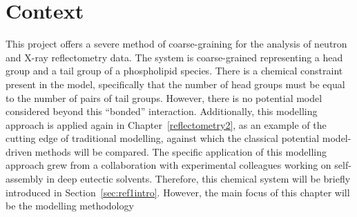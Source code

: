 \section*{Context}
This project offers a severe method of coarse-graining for the analysis of neutron and X-ray reflectometry data.
The system is coarse-grained representing a head group and a tail group of a phospholipid species.
There is a chemical constraint present in the model, specifically that the number of head groups must be equal to the number of pairs of tail groups.
However, there is no potential model considered beyond this ``bonded'' interaction.
Additionally, this modelling approach is applied again in Chapter~\ref{reflectometry2}, as an example of the cutting edge of traditional modelling, against which the classical potential model-driven methods will be compared.
The specific application of this modelling approach grew from a collaboration with experimental colleagues working on self-assembly in deep eutectic solvents.
Therefore, this chemical system will be briefly introduced in Section~\ref{sec:ref1intro}.
However, the main focus of this chapter will be the modelling methodology
